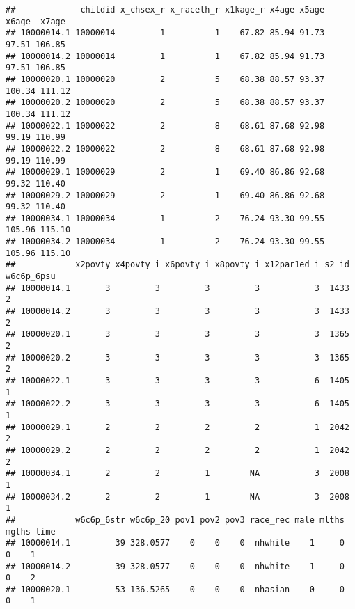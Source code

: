 \documentclass[
]{article}
\newenvironment{Shaded}{\begin{snugshade}}{\end{snugshade}}
\newcommand{\DataTypeTok}[1]{\textcolor[rgb]{0.13,0.29,0.53}{#1}}
\newcommand{\DecValTok}[1]{\textcolor[rgb]{0.00,0.00,0.81}{#1}}
\newcommand{\KeywordTok}[1]{\textcolor[rgb]{0.13,0.29,0.53}{\textbf{#1}}}
\newcommand{\NormalTok}[1]{#1}
\newcommand{\OperatorTok}[1]{\textcolor[rgb]{0.81,0.36,0.00}{\textbf{#1}}}
\begin{document}
\begin{Shaded}
\end{Shaded}

\begin{verbatim}
##             childid x_chsex_r x_raceth_r x1kage_r x4age x5age  x6age  x7age
## 10000014.1 10000014         1          1    67.82 85.94 91.73  97.51 106.85
## 10000014.2 10000014         1          1    67.82 85.94 91.73  97.51 106.85
## 10000020.1 10000020         2          5    68.38 88.57 93.37 100.34 111.12
## 10000020.2 10000020         2          5    68.38 88.57 93.37 100.34 111.12
## 10000022.1 10000022         2          8    68.61 87.68 92.98  99.19 110.99
## 10000022.2 10000022         2          8    68.61 87.68 92.98  99.19 110.99
## 10000029.1 10000029         2          1    69.40 86.86 92.68  99.32 110.40
## 10000029.2 10000029         2          1    69.40 86.86 92.68  99.32 110.40
## 10000034.1 10000034         1          2    76.24 93.30 99.55 105.96 115.10
## 10000034.2 10000034         1          2    76.24 93.30 99.55 105.96 115.10
##            x2povty x4povty_i x6povty_i x8povty_i x12par1ed_i s2_id w6c6p_6psu
## 10000014.1       3         3         3         3           3  1433          2
## 10000014.2       3         3         3         3           3  1433          2
## 10000020.1       3         3         3         3           3  1365          2
## 10000020.2       3         3         3         3           3  1365          2
## 10000022.1       3         3         3         3           6  1405          1
## 10000022.2       3         3         3         3           6  1405          1
## 10000029.1       2         2         2         2           1  2042          2
## 10000029.2       2         2         2         2           1  2042          2
## 10000034.1       2         2         1        NA           3  2008          1
## 10000034.2       2         2         1        NA           3  2008          1
##            w6c6p_6str w6c6p_20 pov1 pov2 pov3 race_rec male mlths mgths time
## 10000014.1         39 328.0577    0    0    0  nhwhite    1     0     0    1
## 10000014.2         39 328.0577    0    0    0  nhwhite    1     0     0    2
## 10000020.1         53 136.5265    0    0    0  nhasian    0     0     0    1

\end{verbatim}
\end{document}
